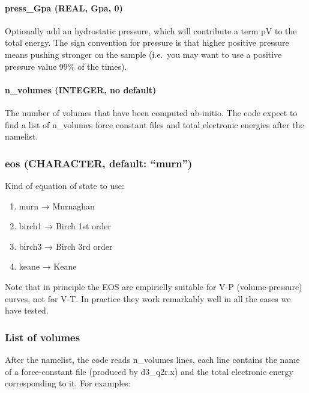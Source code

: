 \documentclass[
]{article}
\providecommand{\tightlist}{%
  \setlength{\itemsep}{0pt}\setlength{\parskip}{0pt}}
\begin{document}
\hypertarget{press_gpa-real-gpa-0}{%
\paragraph{press\_Gpa (REAL, Gpa, 0)}\label{press_gpa-real-gpa-0}}

Optionally add an hydrostatic pressure, which will contribute a term pV
to the total energy. The sign convention for pressure is that higher
positive pressure means pushing stronger on the sample (i.e.~you may
want to use a positive pressure value 99\% of the times).

\hypertarget{n_volumes-integer-no-default}{%
\paragraph{n\_volumes (INTEGER, no
default)}\label{n_volumes-integer-no-default}}

The number of volumes that have been computed ab-initio. The code expect
to find a list of n\_volumes force constant files and total electronic
energies after the namelist.

\hypertarget{eos-character-default-murn}{%
\subsubsection{\texorpdfstring{eos (CHARACTER, default:
\enquote{murn})}{eos (CHARACTER, default: ``murn'')}}\label{eos-character-default-murn}}

Kind of equation of state to use:

\begin{enumerate}
\def\labelenumi{\arabic{enumi}.}
\tightlist
\item
  murn → Murnaghan
\item
  birch1 → Birch 1st order
\item
  birch3 → Birch 3rd order
\item
  keane → Keane
\end{enumerate}

Note that in principle the EOS are empiriclly suitable for V-P
(volume-pressure) curves, not for V-T. In practice they work remarkably
well in all the cases we have tested.

\hypertarget{list-of-volumes}{%
\subsubsection{List of volumes}\label{list-of-volumes}}

After the namelist, the code reads n\_volumes lines, each line contains
the name of a force-constant file (produced by d3\_q2r.x) and the total
electronic energy corresponding to it. For examples:
\end{document}
